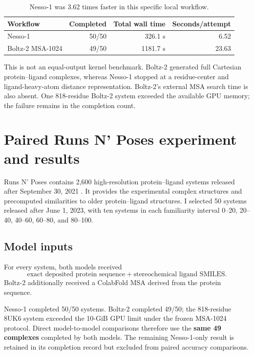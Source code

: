 \documentclass[11pt]{article}
\begin{document}
\begin{table}[H]
\centering
\small
\begin{tabular}{L{0.31\textwidth}rrr}
\toprule
Workflow & Completed & Total wall time & Seconds/attempt \\
\midrule
Nesso-1 & 50/50 & 326.1 s & 6.52 \\
Boltz-2 MSA-1024 & 49/50 & 1181.7 s & 23.63 \\
\bottomrule
\end{tabular}
\caption{Nesso-1 was 3.62 times faster in this specific local workflow.}
\end{table}

This is not an equal-output kernel benchmark. Boltz-2 generated full Cartesian
protein--ligand complexes, whereas Nesso-1 stopped at a residue-center and
ligand-heavy-atom distance representation. Boltz-2's external MSA search time
is also absent. One 818-residue Boltz-2 system exceeded the available GPU
memory; the failure remains in the completion count.

\section{Paired Runs N' Poses experiment and results}

Runs N' Poses contains 2,600 high-resolution protein--ligand systems released
after September 30, 2021 \citep{skrinjar2025runsnposes}. It provides the
experimental complex structures and precomputed similarities to older
protein--ligand structures. I selected 50 systems released after June 1, 2023,
with ten systems in each familiarity interval 0--20, 20--40, 40--60,
60--80, and 80--100.

\subsection{Model inputs}

For every system, both models received
\[
  \text{exact deposited protein sequence}+\text{stereochemical ligand SMILES}.
\]
Boltz-2 additionally received a ColabFold MSA derived from the protein
sequence.

Nesso-1 completed 50/50 systems. Boltz-2 completed 49/50; the 818-residue 8UK6
system exceeded the 10-GiB GPU limit under the frozen MSA-1024 protocol. Direct
model-to-model comparisons therefore use the \textbf{same 49 complexes}
completed by both models. The remaining Nesso-1-only result is retained in its
completion record but excluded from paired accuracy comparisons.
\end{document}
